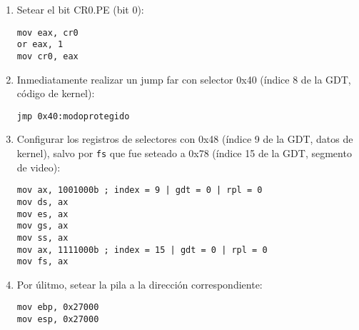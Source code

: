 	\lstset{escapechar=@,style=asm}
	\begin{enumerate}
		\item Setear el bit CR0.PE (bit 0):

		\begin{lstlisting}
mov eax, cr0
or eax, 1
mov cr0, eax
		\end{lstlisting}

		\item Inmediatamente realizar un jump far con selector 0x40 (índice 8 de la GDT, código de kernel):
    
		\begin{lstlisting}
jmp 0x40:modoprotegido
		\end{lstlisting}
		
		\item Configurar los registros de selectores con 0x48 (índice 9 de la GDT, datos de kernel), salvo por \texttt{fs} que fue seteado a 0x78 (índice 15 de la GDT, segmento de video):

		\begin{lstlisting}
mov ax, 1001000b ; index = 9 | gdt = 0 | rpl = 0
mov ds, ax
mov es, ax
mov gs, ax
mov ss, ax
mov ax, 1111000b ; index = 15 | gdt = 0 | rpl = 0
mov fs, ax
		\end{lstlisting}

		\item Por úlitmo, setear la pila a la dirección correspondiente:

		\begin{lstlisting}
mov ebp, 0x27000
mov esp, 0x27000
		\end{lstlisting}

	\end{enumerate}